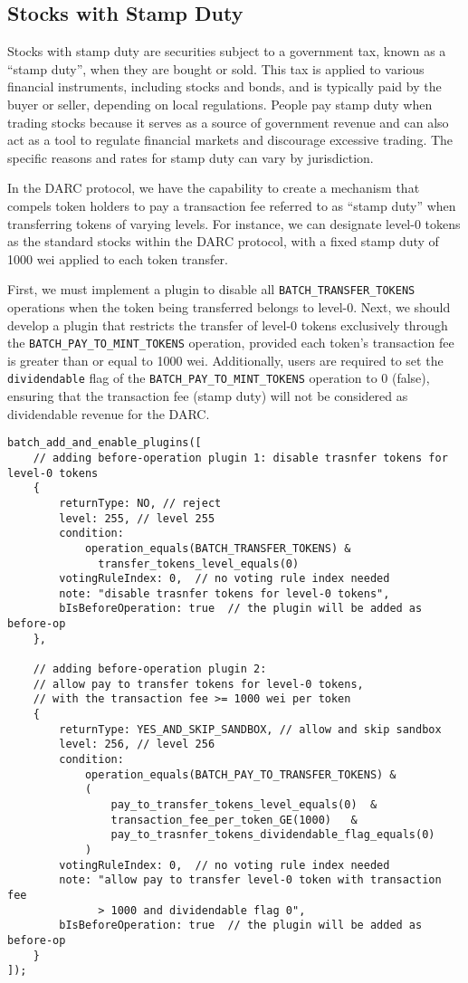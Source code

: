\documentclass[main.tex]{subfiles}
\begin{document}
\subsection{Stocks with Stamp Duty}

Stocks with stamp duty are securities subject to a government tax, known as a ``stamp duty'', when they are bought or sold. This tax is applied to various financial instruments, including stocks and bonds, and is typically paid by the buyer or seller, depending on local regulations. People pay stamp duty when trading stocks because it serves as a source of government revenue and can also act as a tool to regulate financial markets and discourage excessive trading. The specific reasons and rates for stamp duty can vary by jurisdiction.

In the DARC protocol, we have the capability to create a mechanism that compels token holders to pay a transaction fee referred to as ``stamp duty'' when transferring tokens of varying levels. For instance, we can designate level-0 tokens as the standard stocks within the DARC protocol, with a fixed stamp duty of 1000 wei applied to each token transfer.

First, we must implement a plugin to disable all \texttt{BATCH\_TRANSFER\_TOKENS} operations when the token being transferred belongs to level-0. Next, we should develop a plugin that restricts the transfer of level-0 tokens exclusively through the \texttt{BATCH\_PAY\_TO\_MINT\_TOKENS} operation, provided each token's transaction fee is greater than or equal to 1000 wei. Additionally, users are required to set the \texttt{dividendable} flag of the \texttt{BATCH\_PAY\_TO\_MINT\_TOKENS} operation to 0 (false), ensuring that the transaction fee (stamp duty) will not be considered as dividendable revenue for the DARC.

\begin{verbatim}
batch_add_and_enable_plugins([
    // adding before-operation plugin 1: disable trasnfer tokens for level-0 tokens
    {
        returnType: NO, // reject
        level: 255, // level 255
        condition:
            operation_equals(BATCH_TRANSFER_TOKENS) & 
              transfer_tokens_level_equals(0)
        votingRuleIndex: 0,  // no voting rule index needed
        note: "disable trasnfer tokens for level-0 tokens",
        bIsBeforeOperation: true  // the plugin will be added as before-op
    },

    // adding before-operation plugin 2: 
    // allow pay to transfer tokens for level-0 tokens, 
    // with the transaction fee >= 1000 wei per token
    {
        returnType: YES_AND_SKIP_SANDBOX, // allow and skip sandbox
        level: 256, // level 256
        condition:
            operation_equals(BATCH_PAY_TO_TRANSFER_TOKENS) & 
            ( 
                pay_to_transfer_tokens_level_equals(0)  &
                transaction_fee_per_token_GE(1000)   &
                pay_to_trasnfer_tokens_dividendable_flag_equals(0)
            )
        votingRuleIndex: 0,  // no voting rule index needed
        note: "allow pay to transfer level-0 token with transaction fee 
              > 1000 and dividendable flag 0",
        bIsBeforeOperation: true  // the plugin will be added as before-op
    }
]);
\end{verbatim}
\end{document}
